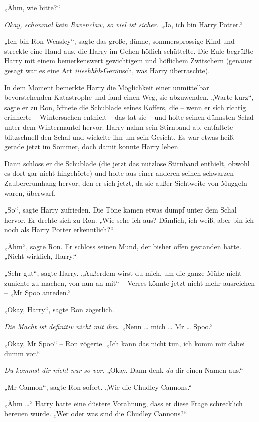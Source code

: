 {„Ähm, wie bitte?“

\emph{Okay, schonmal kein Ravenclaw, so viel ist sicher.} „Ja, ich bin Harry Potter.“

„Ich bin Ron Weasley“, sagte das große, dünne, sommersprossige Kind und streckte eine Hand aus, die Harry im Gehen höflich schüttelte. Die Eule begrüßte Harry mit einem bemerkenswert gewichtigem und höflichem Zwitschern (genauer gesagt war es eine Art \emph{iiieehhhk}-Geräusch, was Harry überraschte).

In dem Moment bemerkte Harry die Möglichkeit einer unmittelbar bevorstehenden Katastrophe und fand einen Weg, sie abzuwenden. „Warte kurz“, sagte er zu Ron, öffnete die Schublade seines Koffers, die -- wenn er sich richtig erinnerte -- Wintersachen enthielt -- das tat sie -- und holte seinen dünnsten Schal unter dem Wintermantel hervor. Harry nahm sein Stirnband ab, entfaltete blitzschnell den Schal und wickelte ihn um sein Gesicht. Es war etwas heiß, gerade jetzt im Sommer, doch damit konnte Harry leben.

Dann schloss er die Schublade (die jetzt das nutzlose Stirnband enthielt, obwohl es dort gar nicht hingehörte) und holte aus einer anderen seinen schwarzen Zaubererumhang hervor, den er sich jetzt, da sie außer Sichtweite von Muggeln waren, überwarf.

„So“, sagte Harry zufrieden. Die Töne kamen etwas dumpf unter dem Schal hervor. Er drehte sich zu Ron. „Wie sehe ich aus? Dämlich, ich weiß, aber bin ich noch als Harry Potter erkenntlich?“

„Ähm“, sagte Ron. Er schloss seinen Mund, der bisher offen gestanden hatte. „Nicht wirklich, Harry.“

„Sehr gut“, sagte Harry. „Außerdem wirst du mich, um die ganze Mühe nicht zunichte zu machen, von nun an mit“ -- Verres könnte jetzt nicht mehr ausreichen -- „Mr Spoo anreden.“

„Okay, Harry“, sagte Ron zögerlich.

\emph{Die Macht ist definitiv nicht mit ihm.} „Nenn … mich … Mr … Spoo.“

„Okay, Mr Spoo“ -- Ron zögerte. „Ich kann das nicht tun, ich komm mir dabei dumm vor.“

\emph{Du kommst dir nicht nur so vor.} „Okay. Dann denk \emph{du} dir einen Namen aus.“

„Mr Cannon“, sagte Ron sofort. „Wie die Chudley Cannons.“

„Ähm …“ Harry hatte eine düstere Vorahnung, dass er diese Frage schrecklich bereuen würde. „Wer oder was sind die Chudley Cannons?“

}
